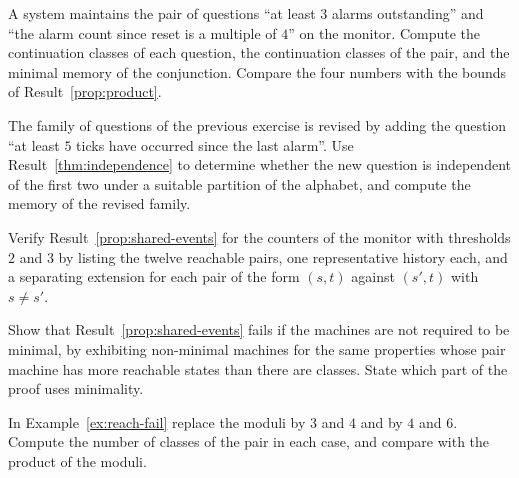 \begin{exercise}
A system maintains the pair of questions ``at least $3$ alarms outstanding'' and ``the alarm count since reset is a multiple of $4$'' on the monitor. Compute the continuation classes of each question, the continuation classes of the pair, and the minimal memory of the conjunction. Compare the four numbers with the bounds of Result~\ref{prop:product}.
\end{exercise}

\begin{exercise}
The family of questions of the previous exercise is revised by adding the question ``at least $5$ ticks have occurred since the last alarm''. Use Result~\ref{thm:independence} to determine whether the new question is independent of the first two under a suitable partition of the alphabet, and compute the memory of the revised family.
\end{exercise}


\begin{exercise}
Verify Result~\ref{prop:shared-events} for the counters of the monitor with thresholds $2$ and $3$ by listing the twelve reachable pairs, one representative history each, and a separating extension for each pair of the form $(s,t)$ against $(s',t)$ with $s\ne s'$.
\end{exercise}

\begin{exercise}
Show that Result~\ref{prop:shared-events} fails if the machines are not required to be minimal, by exhibiting non-minimal machines for the same properties whose pair machine has more reachable states than there are classes. State which part of the proof uses minimality.
\end{exercise}

\begin{exercise}
In Example~\ref{ex:reach-fail} replace the moduli by $3$ and $4$ and by $4$ and $6$. Compute the number of classes of the pair in each case, and compare with the product of the moduli.\label{ex:moduli-pairs}
\end{exercise}

